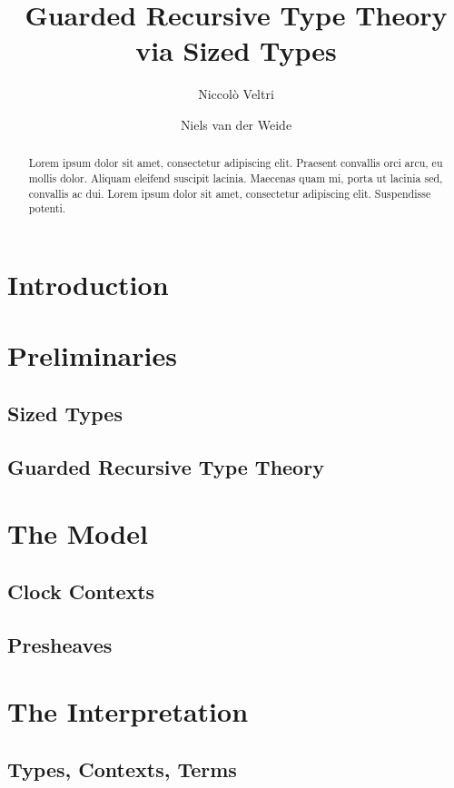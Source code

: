 \documentclass[a4paper,UKenglish]{lipics-v2018}
\title{Guarded Recursive Type Theory via Sized Types}
\author{Niccol\`o Veltri}{Dummy University Computing Laboratory, [Address], Country}{johnqpublic@dummyuni.org}{https://orcid.org/0000-0002-1825-0097}{[funding]}%
\author{Niels van der Weide}{iCIS, Radboud Universiteit, The Netherlands}{nweide@cs.ru.nl}{}{}
\begin{document}
\maketitle

\begin{abstract}
Lorem ipsum dolor sit amet, consectetur adipiscing elit. Praesent convallis orci arcu, eu mollis dolor. Aliquam eleifend suscipit lacinia. Maecenas quam mi, porta ut lacinia sed, convallis ac dui. Lorem ipsum dolor sit amet, consectetur adipiscing elit. Suspendisse potenti. 
 \end{abstract}

\section{Introduction}
\cite{atkey2013productive}

\section{Preliminaries}


\subsection{Sized Types}

\subsection{Guarded Recursive Type Theory}

\section{The Model}

\subsection{Clock Contexts}

\subsection{Presheaves}

\section{The Interpretation}

\subsection{Types, Contexts, Terms}
\end{document}
